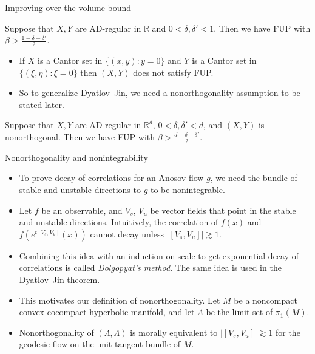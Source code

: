 \documentclass[10pt]{beamer}
\newcommand{\RR}{\mathbb{R}}
\begin{document}
\begin{frame}{Improving over the volume bound}
\begin{theorem}
Suppose that $X, Y$ are AD-regular in $\RR$ and $0 < \delta, \delta' < 1$. Then we have FUP with $\beta > \frac{1 - \delta - \delta'}{2}$.
\end{theorem} \pause

\begin{itemize}
\item If $X$ is a Cantor set in $\{(x, y): y = 0\}$ and $Y$ is a Cantor set in $\{(\xi, \eta): \xi = 0\}$ then $(X, Y)$ does not satisfy FUP. \pause
\item So to generalize Dyatlov--Jin, we need a nonorthogonality assumption to be stated later. \pause
\end{itemize}

\begin{theorem}
Suppose that $X, Y$ are AD-regular in $\RR^d$, $0 < \delta, \delta' < d$, and $(X, Y)$ is nonorthogonal. Then we have FUP with $\beta > \frac{d - \delta - \delta'}{2}$.
\end{theorem}
\end{frame}

\begin{frame}{Nonorthogonality and nonintegrability}
\begin{itemize}
\item To prove decay of correlations for an Anosov flow $g$, we need the bundle of stable and unstable directions to $g$ to be nonintegrable. \pause
\item Let $f$ be an observable, and $V_s$, $V_u$ be vector fields that point in the stable and unstable directions. Intuitively, the correlation of $f(x)$ and $f(e^{t[V_s, V_u]}(x))$ cannot decay unless $|[V_s, V_u]| \gtrsim 1$. \pause
\item Combining this idea with an induction on scale to get exponential decay of correlations is called \emph{Dolgopyat's method}. The same idea is used in the Dyatlov--Jin theorem. \pause
\item This motivates our definition of nonorthogonality. Let $M$ be a noncompact convex cocompact hyperbolic manifold, and let $\Lambda$ be the limit set of $\pi_1(M)$. \pause
\item Nonorthogonality of $(\Lambda, \Lambda)$ is morally equivalent to $|[V_s, V_u]| \gtrsim 1$ for the geodesic flow on the unit tangent bundle of $M$.
\end{itemize}
\end{frame}
\end{document}

